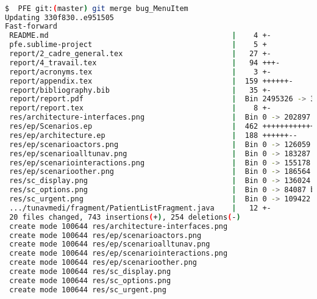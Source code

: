 \begin{lstlisting}[language=bash, label=lst:git_merge, caption=Git merge]

$  PFE git:(master) git merge bug_MenuItem 
Updating 330f830..e951505
Fast-forward
 README.md                                          |    4 +-
 pfe.sublime-project                                |    5 +
 report/2_cadre_general.tex                         |   27 +-
 report/4_travail.tex                               |   94 +++-
 report/acronyms.tex                                |    3 +-
 report/appendix.tex                                |  159 ++++++-
 report/bibliography.bib                            |   35 +-
 report/report.pdf                                  |  Bin 2495326 -> 3213273 bytes
 report/report.tex                                  |    8 +-
 res/architecture-interfaces.png                    |  Bin 0 -> 202897 bytes
 res/ep/Scenarios.ep                                |  462 ++++++++++++--------
 res/ep/architecture.ep                             |  188 ++++++--
 res/ep/scenarioactors.png                          |  Bin 0 -> 126059 bytes
 res/ep/scenarioalltunav.png                        |  Bin 0 -> 183287 bytes
 res/ep/scenariointeractions.png                    |  Bin 0 -> 155178 bytes
 res/ep/scenarioother.png                           |  Bin 0 -> 186564 bytes
 res/sc_display.png                                 |  Bin 0 -> 136024 bytes
 res/sc_options.png                                 |  Bin 0 -> 84087 bytes
 res/sc_urgent.png                                  |  Bin 0 -> 109422 bytes
 .../tunavmedi/fragment/PatientListFragment.java    |   12 +-
 20 files changed, 743 insertions(+), 254 deletions(-)
 create mode 100644 res/architecture-interfaces.png
 create mode 100644 res/ep/scenarioactors.png
 create mode 100644 res/ep/scenarioalltunav.png
 create mode 100644 res/ep/scenariointeractions.png
 create mode 100644 res/ep/scenarioother.png
 create mode 100644 res/sc_display.png
 create mode 100644 res/sc_options.png
 create mode 100644 res/sc_urgent.png

\end{lstlisting}